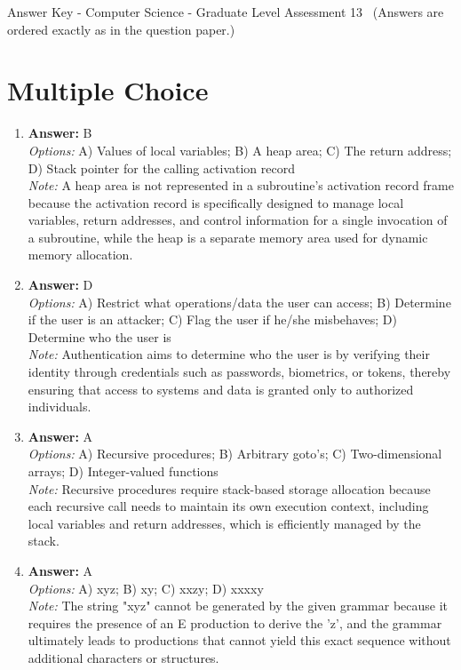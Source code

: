 \documentclass[12pt]{article}
\begin{document}
\begin{center}
Answer Key - Computer Science - Graduate Level Assessment 13 \
\small (Answers are ordered exactly as in the question paper.)
\end{center}

\section*{Multiple Choice}
\begin{enumerate}[label=\arabic*.]
\item \textbf{Answer:} B
\\ \textit{Options:} A) Values of local variables; B) A heap area; C) The return address; D) Stack pointer for the calling activation record
\\ \textit{Note:} A heap area is not represented in a subroutine's activation record frame because the activation record is specifically designed to manage local variables, return addresses, and control information for a single invocation of a subroutine, while the heap is a separate memory area used for dynamic memory allocation.
\item \textbf{Answer:} D
\\ \textit{Options:} A) Restrict what operations/data the user can access; B) Determine if the user is an attacker; C) Flag the user if he/she misbehaves; D) Determine who the user is
\\ \textit{Note:} Authentication aims to determine who the user is by verifying their identity through credentials such as passwords, biometrics, or tokens, thereby ensuring that access to systems and data is granted only to authorized individuals.
\item \textbf{Answer:} A
\\ \textit{Options:} A) Recursive procedures; B) Arbitrary goto's; C) Two-dimensional arrays; D) Integer-valued functions
\\ \textit{Note:} Recursive procedures require stack-based storage allocation because each recursive call needs to maintain its own execution context, including local variables and return addresses, which is efficiently managed by the stack.
\item \textbf{Answer:} A
\\ \textit{Options:} A) xyz; B) xy; C) xxzy; D) xxxxy
\\ \textit{Note:} The string "xyz" cannot be generated by the given grammar because it requires the presence of an E production to derive the 'z', and the grammar ultimately leads to productions that cannot yield this exact sequence without additional characters or structures.

\end{enumerate}
\end{document}
